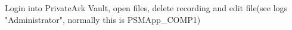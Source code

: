 Login into PrivateArk Vault, open files, delete recording and edit file(see logs "Administrator", normally this is PSMApp\_COMP1)